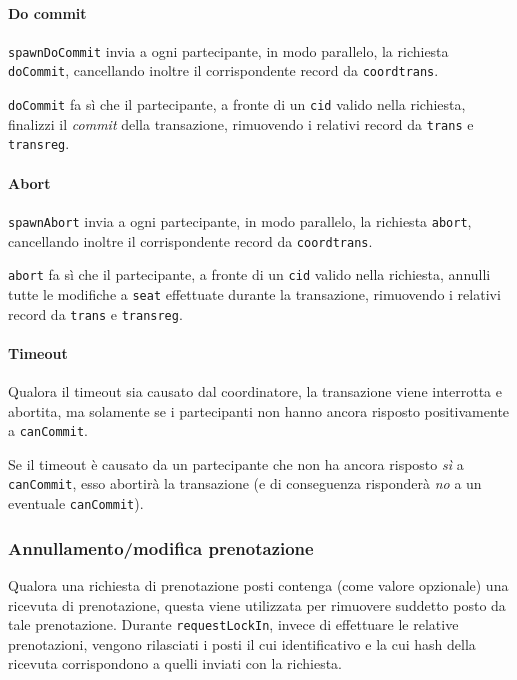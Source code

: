 \documentclass[a4paper]{article}
\begin{document}
\paragraph{Do commit}\texttt{spawnDoCommit} invia a ogni partecipante, in modo parallelo, la richiesta \texttt{doCommit}, cancellando inoltre il corrispondente record da \texttt{coordtrans}.

\texttt{doCommit} fa sì che il partecipante, a fronte di un \texttt{cid} valido nella richiesta, finalizzi il \textit{commit} della transazione, rimuovendo i relativi record da \texttt{trans} e \texttt{transreg}. %

\paragraph{Abort}\texttt{spawnAbort} invia a ogni partecipante, in modo parallelo, la richiesta \texttt{abort}, cancellando inoltre il corrispondente record da \texttt{coordtrans}.

\texttt{abort} fa sì che il partecipante, a fronte di un \texttt{cid} valido nella richiesta, annulli tutte le modifiche a \texttt{seat} effettuate durante la transazione, rimuovendo i relativi record da \texttt{trans} e \texttt{transreg}.

\paragraph{Timeout}
Qualora il timeout sia causato dal coordinatore, la transazione viene interrotta e abortita, ma solamente se i partecipanti non hanno ancora risposto positivamente a \texttt{canCommit}.

Se il timeout è causato da un partecipante che non ha ancora risposto \textit{sì} a \texttt{canCommit}, esso abortirà la transazione (e di conseguenza risponderà \textit{no} a un eventuale \texttt{canCommit}).

\subsubsection{Annullamento/modifica prenotazione}
Qualora una richiesta di prenotazione posti contenga (come valore opzionale) una ricevuta di prenotazione, questa viene utilizzata per rimuovere suddetto posto da tale prenotazione. Durante \texttt{requestLockIn}, invece di effettuare le relative prenotazioni, vengono rilasciati i posti il cui identificativo e la cui hash della ricevuta corrispondono a quelli inviati con la richiesta.
\end{document}
